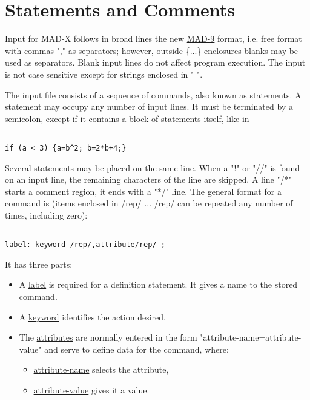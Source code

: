
\section{Statements and Comments}

Input for MAD-X follows in broad lines the new
\href{http://cern.ch/mad9}{MAD-9} format, i.e. free format with commas
"," as separators; however, outside \{...\} enclosures blanks may be
used as separators. Blank input lines do not affect program
execution. The input is not case sensitive except for strings enclosed
in " ". 

The input file consists of a sequence of commands, also known as
statements. A statement may occupy any number of  input lines. It must
be terminated by a semicolon, except if it contains a block of
statements itself, like in  

\begin{verbatim}

if (a < 3) {a=b^2; b=2*b+4;}
\end{verbatim}

Several statements may be placed on the same line.
When a "!" or "//" is found on an input line,
the remaining characters of the line are skipped.
A line "/*" starts a comment region, it ends with a "*/" line.
The general format for a command is (items enclosed in /rep/ ... /rep/
can be repeated any number of times, including zero):

\begin{verbatim}

label: keyword /rep/,attribute/rep/ ;
\end{verbatim}

It has three parts:

\begin{itemize}
   \item A \href{label.html}{label}
     is required for a definition statement.
     It gives a name to the stored command.
     
   \item A \href{keyword.html}{keyword}
     identifies the action desired.
     
   \item The \href{attribute HREF=attribute.html}{attributes}
     are normally entered in the form
     "attribute-name=attribute-value"
     and serve to define data for the command, where:

     \begin{itemize}
       \item \href{label.html}{attribute-name} selects the attribute,

       \item \href{attribute.html}{attribute-value} gives it a value.
         
     \end{itemize}
\end{itemize}

